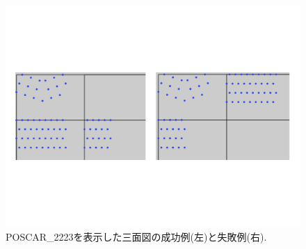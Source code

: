 \begin{figure}[htbp]\begin{center}
\includegraphics[width=12cm,bb= 0 0 937 753]{../figs/./boundary_narita.014.jpg}
\caption{POSCAR\_2223を表示した三面図の成功例(左)と失敗例(右).}
\label{default}\end{center}\end{figure}
